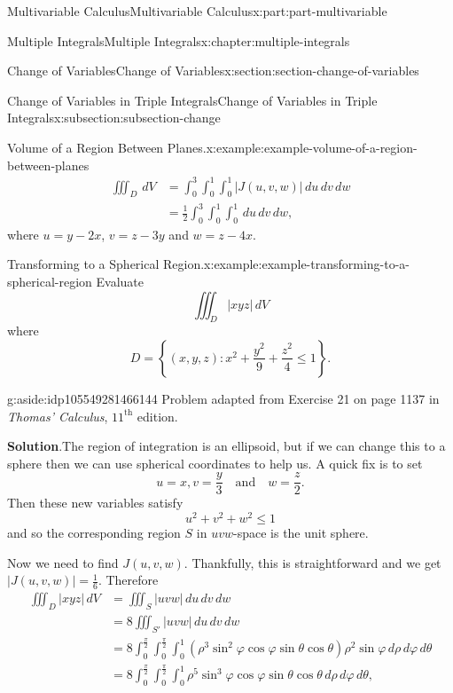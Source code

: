 \documentclass[twoside,10pt,]{book}
\newcommand{\blocktitlefont}{\relax}
\numberwithin{equation}{part}
\newcommand{\abs}[1]{\left| #1 \right|}
\newcommand{\set}[1]{\left\{ #1 \right\}}
\newcommand{\qq}[1]{\quad\text{#1}\quad}
\newcommand{\amp}{&}
\begin{document}
\begin{partptx}{Multivariable Calculus}{}{Multivariable Calculus}{}{}{x:part:part-multivariable}
\begin{chapterptx}{Multiple Integrals}{}{Multiple Integrals}{}{}{x:chapter:multiple-integrals}
\begin{sectionptx}{Change of Variables}{}{Change of Variables}{}{}{x:section:section-change-of-variables}
\begin{subsectionptx}{Change of Variables in Triple Integrals}{}{Change of Variables in Triple Integrals}{}{}{x:subsection:subsection-change}
\begin{example}{Volume of a Region Between Planes.}{x:example:example-volume-of-a-region-between-planes}
\begin{align*}
\iiint_{D}\,dV \amp = \int_{0}^{3}\int_{0}^{1}\int_{0}^{1}\abs{J(u,v,w)}\,du\,dv\,dw \\
\amp = \frac{1}{2}\int_{0}^{3}\int_{0}^{1}\int_{0}^{1}\,du\,dv\,dw \text{,}
\end{align*}
where \(u = y - 2x\), \(v = z - 3y\) and \(w = z - 4x\).%
\end{example}
\begin{example}{Transforming to a Spherical Region.}{x:example:example-transforming-to-a-spherical-region}%
Evaluate%
\begin{equation*}
\iiint_{D}\abs{xyz}\,dV
\end{equation*}
where%
\begin{equation*}
D = \set{(x,y,z) : x^{2} + \frac{y^{2}}{9} + \frac{z^{2}}{4} \leq 1}\text{.}
\end{equation*}
%
\begin{aside}{}{g:aside:idp105549281466144}%
Problem adapted from Exercise 21 on page 1137 in \emph{Thomas' Calculus}, \(11^{\text{th}}\) edition.%
\end{aside}
\par\smallskip%
\noindent\textbf{\blocktitlefont Solution}.\hypertarget{g:solution:idp105549281467296}{}\quad{}The region of integration is an ellipsoid, but if we can change this to a sphere then we can use spherical coordinates to help us. A quick fix is to set%
\begin{equation*}
u = x, v = \frac{y}{3} \qq{and} w = \frac{z}{2}\text{.}
\end{equation*}
Then these new variables satisfy%
\begin{equation*}
u^{2} + v^{2} + w^{2} \leq 1
\end{equation*}
and so the corresponding region \(S\) in \(uvw\)-space is the unit sphere.%
\par
Now we need to find \(J(u,v,w)\). Thankfully, this is straightforward and we get \(\abs{J(u,v,w)} = \frac{1}{6}\). Therefore%
\begin{align*}
\iiint_{D}\abs{xyz}\,dV \amp = \iiint_{S}\abs{uvw}\,du\,dv\,dw \\
\amp = 8\iiint_{S'}\abs{uvw}\,du\,dv\,dw \\
\amp = 8\int_{0}^{\frac{\pi}{2}}\int_{0}^{\frac{\pi}{2}}\int_{0}^{1}(\rho^{3}\sin^{2}\varphi\cos\varphi\sin\theta\cos\theta)\rho^{2}\sin\varphi\,d\rho\,d\varphi\,d\theta \\
\amp = 8\int_{0}^{\frac{\pi}{2}}\int_{0}^{\frac{\pi}{2}}\int_{0}^{1}\rho^{5}\sin^{3}\varphi\cos\varphi\sin\theta\cos\theta\,d\rho\,d\varphi\,d\theta\text{,}

\end{align*}
\end{example}
\end{subsectionptx}
\end{sectionptx}
\end{chapterptx}
\end{partptx}
\end{document}
